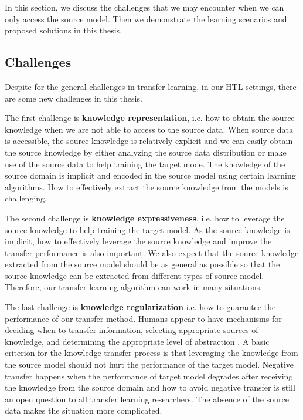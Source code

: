 In this section, we discuss the challenges that we may encounter when we can only access the source model. Then we demonstrate the learning scenarios and proposed solutions in this thesis.

\subsection{Challenges}
Despite for the general challenges in transfer learning, in our HTL settings, there are some new challenges in this thesis.

The first challenge is \textbf{knowledge representation}, i.e. how to obtain the source knowledge when we are not able to access to the source data. When source data is accessible, the source knowledge is relatively explicit and we can easily obtain the source knowledge by either analyzing the source data distribution or make use of the source data to help training the target mode. The knowledge of the source domain is implicit and encoded in the source model using certain learning algorithms. How to effectively extract the source knowledge from the models is challenging.

The second challenge is \textbf{knowledge expressiveness}, i.e. how to leverage the source knowledge to help training the target model. As the source knowledge is implicit, how to effectively leverage the source knowledge and improve the transfer performance is also important. We also expect that the source knowledge extracted from the source model should be as general as possible so that the source knowledge can be extracted from different types of source model. Therefore, our transfer learning algorithm can work in many situations. 

The last challenge is \textbf{knowledge regularization} i.e. how to guarantee the performance of our transfer method. 
Humans appear to have mechanisms for deciding when to transfer information, selecting appropriate sources of knowledge, and determining the appropriate level of abstraction \cite{torrey2009transfer}. 
A basic criterion for the knowledge transfer process is that leveraging the knowledge from the source model should not hurt the performance of the target model. Negative transfer \cite{pan2010survey} happens when the performance of target model degrades after receiving the knowledge from the source domain and how to avoid negative transfer is still an open question to all transfer learning researchers. The absence of the source data makes the situation more complicated.

